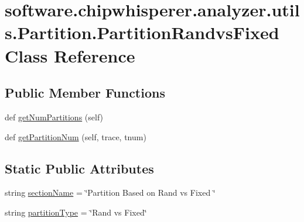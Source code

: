 \hypertarget{classsoftware_1_1chipwhisperer_1_1analyzer_1_1utils_1_1Partition_1_1PartitionRandvsFixed}{}\section{software.\+chipwhisperer.\+analyzer.\+utils.\+Partition.\+Partition\+Randvs\+Fixed Class Reference}
\label{classsoftware_1_1chipwhisperer_1_1analyzer_1_1utils_1_1Partition_1_1PartitionRandvsFixed}
\subsection*{Public Member Functions}
\begin{DoxyCompactItemize}
\item 
def \hyperlink{classsoftware_1_1chipwhisperer_1_1analyzer_1_1utils_1_1Partition_1_1PartitionRandvsFixed_a7fd296d5adf486c2e45dfefd331d1533}{get\+Num\+Partitions} (self)
\item 
def \hyperlink{classsoftware_1_1chipwhisperer_1_1analyzer_1_1utils_1_1Partition_1_1PartitionRandvsFixed_a1401bae6c6fe6c232e1a9d4c976125ea}{get\+Partition\+Num} (self, trace, tnum)
\end{DoxyCompactItemize}
\subsection*{Static Public Attributes}
\begin{DoxyCompactItemize}
\item 
string \hyperlink{classsoftware_1_1chipwhisperer_1_1analyzer_1_1utils_1_1Partition_1_1PartitionRandvsFixed_ae6913b45945d0067d3278c2dd3d35af2}{section\+Name} = \char`\"{}Partition Based on Rand vs Fixed \char`\"{}
\item 
string \hyperlink{classsoftware_1_1chipwhisperer_1_1analyzer_1_1utils_1_1Partition_1_1PartitionRandvsFixed_a95113ddd5393bc7dbd414d9f842354a0}{partition\+Type} = \char`\"{}Rand vs Fixed\char`\"{}
\end{DoxyCompactItemize}


